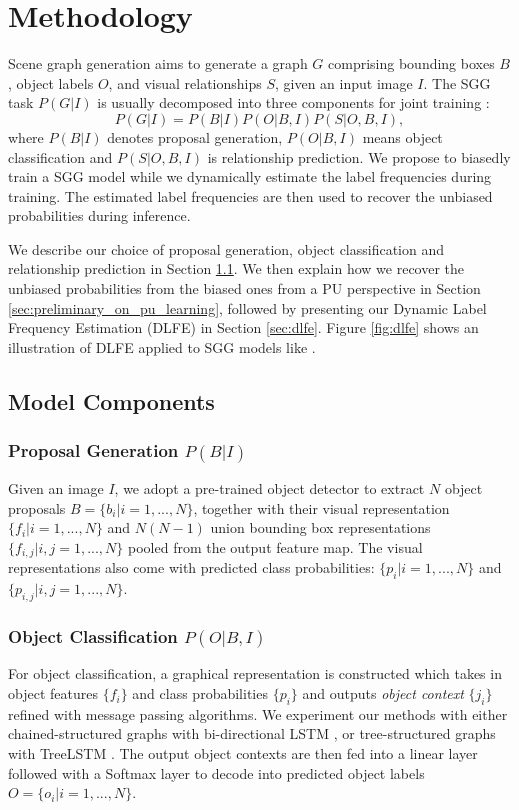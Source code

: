 \documentclass[sigconf]{acmart}
\begin{document}
\section{Methodology}

Scene graph generation aims to generate a graph $G$ comprising bounding boxes $B$, object labels $O$, and visual relationships $S$, given an input image $I$.
The SGG task $P(G|I)$ is usually decomposed into three components for joint training \cite{zellers2018neural}:
\begin{equation}
    P(G|I)=P(B|I)P(O|B,I)P(S|O,B,I),
\end{equation}
where $P(B|I)$ denotes proposal generation, $P(O|B,I)$ means object classification and $P(S|O,B,I)$ is relationship prediction.
We propose to biasedly train a SGG model while we dynamically estimate the label frequencies during training.
The estimated label frequencies are then used to recover the unbiased probabilities during inference.

We describe our choice of proposal generation, object classification and relationship prediction in Section \ref{sec:model_components}.
We then explain how we recover the unbiased probabilities from the biased ones from a PU perspective in Section \ref{sec:preliminary_on_pu_learning}, followed by presenting our Dynamic Label Frequency Estimation (DLFE) in Section \ref{sec:dlfe}.
Figure \ref{fig:dlfe} shows an illustration of DLFE applied to SGG models like \cite{zellers2018neural,tang2019learning}.

\subsection{Model Components}
\label{sec:model_components}
\subsubsection{Proposal Generation $P(B|I)$}
Given an image $I$, we adopt a pre-trained object detector \cite{ren2015faster} to extract $N$ object proposals $B=\{b_i|i=1,...,N\}$, together with their visual representation $\{f_i|i=1,...,N\}$ and $N(N-1)$ union bounding box representations $\{f_{i,j}|i,j=1,...,N\}$ pooled from the output feature map.
The visual representations also come with predicted class probabilities: $\{p_i|i=1,...,N\}$ and $\{p_{i,j}|i,j=1,...,N\}$.

\subsubsection{Object Classification $P(O|B,I)$}
For object classification, a graphical representation is constructed which takes in object features $\{f_{i}\}$ and class probabilities $\{p_{i}\}$ and outputs \textit{object context} $\{j_i\}$ refined with message passing algorithms.
We experiment our methods with either chained-structured graphs \cite{zellers2018neural} with bi-directional LSTM \cite{hochreiter1997long}, or tree-structured graphs \cite{tang2019learning} with TreeLSTM \cite{tai-etal-2015-improved}.
The output object contexts are then fed into a linear layer followed with a Softmax layer to decode into predicted object labels $O=\{o_i|i=1,...,N\}$.
\end{document}
